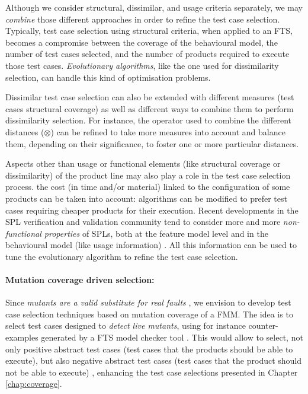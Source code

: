 Although we consider structural, dissimilar, and usage criteria separately, we may \emph{combine} those different approaches in order to refine the test case selection. Typically, test case selection using structural criteria, when applied to an FTS, becomes a compromise between the coverage of the behavioural model, the number of test cases selected, and the number of products required to execute those test cases. \emph{Evolutionary algorithms}, like the one used for dissimilarity selection, can handle this kind of optimisation problems. 

Dissimilar test case selection can also be extended with different measures (\eg test cases structural coverage) as well as different ways to combine them to perform dissimilarity selection. For instance, the operator used to combine the different distances ($\otimes$) can be refined to take more measures into account and balance them, depending on their significance, to foster one or more particular distances.

Aspects other than usage or functional elements (like structural coverage or dissimilarity) of the product line may also play a role in the test case selection process. \Eg the cost (in time and/or material) linked to the configuration of some products can be taken into account: algorithms can be modified to prefer test cases requiring cheaper products for their execution. Recent developments in the SPL verification and validation community tend to consider more and more \emph{non-functional properties} of SPLs, both at the feature model level \cite{Siegmund2015,Siegmund2013,Parejo2016,Olaechea2014,Guo2013,Bartholdt2009,Etxeberria2008} and in the behavioural model (like usage information) \cite{Rodrigues2015,TerBeek2015b,Olaechea2016,terBeek2016}.
All this information can be used to tune the evolutionary algorithm to refine the test case selection.


\paragraph{Mutation coverage driven selection:}

Since \textit{mutants are a valid substitute for real faults} \cite{Just2014},  we envision to develop test case selection techniques based on mutation coverage of a FMM. The idea is to select test cases designed to \emph{detect live mutants}, using for instance counter-examples generated by a FTS model checker tool \cite{Cordy2013}. This would allow to select, not only positive abstract test cases (test cases that the products should be able to execute), but also negative abstract test cases (test cases that the product should not be able to execute) \cite{Ammann1998}, enhancing the test case selections presented in Chapter \ref{chap:coverage}.

